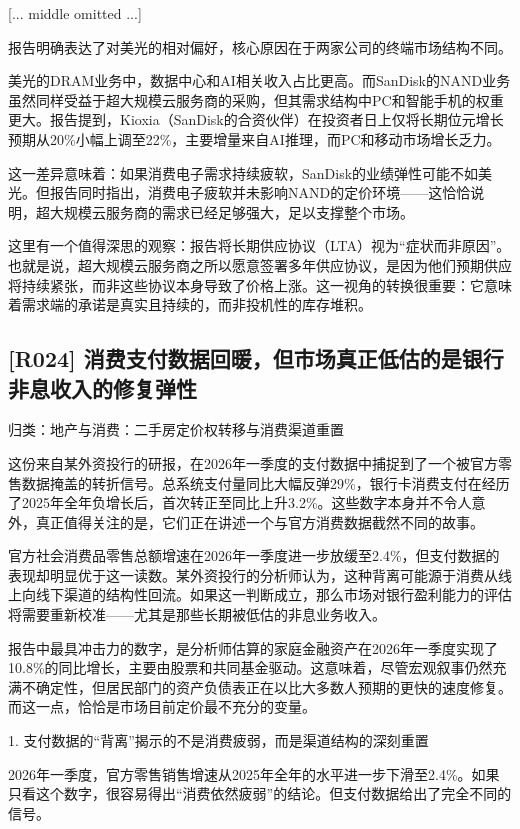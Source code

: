 \documentclass[11pt]{ctexart}
\begin{document}
[... middle omitted ...]


报告明确表达了对美光的相对偏好，核心原因在于两家公司的终端市场结构不同。

美光的DRAM业务中，数据中心和AI相关收入占比更高。而SanDisk的NAND业务虽然同样受益于超大规模云服务商的采购，但其需求结构中PC和智能手机的权重更大。报告提到，Kioxia（SanDisk的合资伙伴）在投资者日上仅将长期位元增长预期从20\%小幅上调至22\%，主要增量来自AI推理，而PC和移动市场增长乏力。

这一差异意味着：如果消费电子需求持续疲软，SanDisk的业绩弹性可能不如美光。但报告同时指出，消费电子疲软并未影响NAND的定价环境——这恰恰说明，超大规模云服务商的需求已经足够强大，足以支撑整个市场。

这里有一个值得深思的观察：报告将长期供应协议（LTA）视为“症状而非原因”。也就是说，超大规模云服务商之所以愿意签署多年供应协议，是因为他们预期供应将持续紧张，而非这些协议本身导致了价格上涨。这一视角的转换很重要：它意味着需求端的承诺是真实且持续的，而非投机性的库存堆积。

\subsection{[R024] 消费支付数据回暖，但市场真正低估的是银行非息收入的修复弹性}
{\small\color{refgray}归类：地产与消费：二手房定价权转移与消费渠道重置}

这份来自某外资投行的研报，在2026年一季度的支付数据中捕捉到了一个被官方零售数据掩盖的转折信号。总系统支付量同比大幅反弹29\%，银行卡消费支付在经历了2025年全年负增长后，首次转正至同比上升3.2\%。这些数字本身并不令人意外，真正值得关注的是，它们正在讲述一个与官方消费数据截然不同的故事。

官方社会消费品零售总额增速在2026年一季度进一步放缓至2.4\%，但支付数据的表现却明显优于这一读数。某外资投行的分析师认为，这种背离可能源于消费从线上向线下渠道的结构性回流。如果这一判断成立，那么市场对银行盈利能力的评估将需要重新校准——尤其是那些长期被低估的非息业务收入。

报告中最具冲击力的数字，是分析师估算的家庭金融资产在2026年一季度实现了10.8\%的同比增长，主要由股票和共同基金驱动。这意味着，尽管宏观叙事仍然充满不确定性，但居民部门的资产负债表正在以比大多数人预期的更快的速度修复。而这一点，恰恰是市场目前定价最不充分的变量。

1. 支付数据的“背离”揭示的不是消费疲弱，而是渠道结构的深刻重置

2026年一季度，官方零售销售增速从2025年全年的水平进一步下滑至2.4\%。如果只看这个数字，很容易得出“消费依然疲弱”的结论。但支付数据给出了完全不同的信号。
\end{document}
